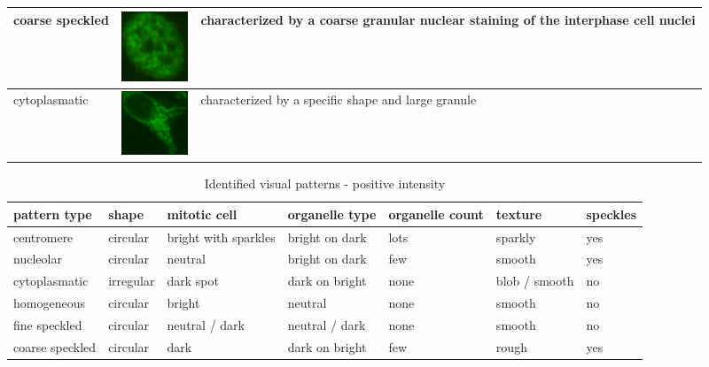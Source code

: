 \begin{table}
\begin{center}
\begin{tabular}{|m{2.3cm}|m{2.1cm}|m{8cm}|}
		coarse speckled & \vspace{5pt} \includegraphics[width=2cm]{Figures/describing/coarse_speckled} & characterized by a coarse granular nuclear staining of the interphase cell nuclei \\ \hline
		
		cytoplasmatic & \vspace{5pt} \includegraphics[width=2cm]{Figures/describing/cytoplasmatic} & characterized by a specific shape and large granule \\ \hline
	\end{tabular}
	\end{center}
\end{table}

\begin{table}
	\caption{Identified visual patterns - positive intensity}
	\label{tab:Vpata}
	\small
	\begin{tabular}{|m{2.2cm}|m{1.4cm}|m{1.5cm}|m{1.5cm}|m{1.4cm}|m{1.6cm}|m{1.4cm}|}
		\hline
		\textbf{pattern type} & \textbf{shape} & \textbf{mitotic cell} & \textbf{organelle type} & \textbf{organelle count} & \textbf{texture} & \textbf{speckles} \\ \hline
		centromere & circular & bright with sparkles & bright on dark & lots & sparkly  & yes \\ \hline
		nucleolar & circular & neutral & bright on dark & few & smooth & yes \\ \hline
		cytoplasmatic & irregular & dark spot & dark on bright & none & blob / smooth  & no \\ \hline
		homogeneous & circular & bright & neutral & none & smooth & no \\ \hline
		fine speckled & circular & neutral / dark & neutral / dark & none & smooth & no \\ \hline
		coarse speckled & circular & dark & dark on bright & few & rough & yes \\ \hline
	\end{tabular}
	\normalsize
\end{table}

